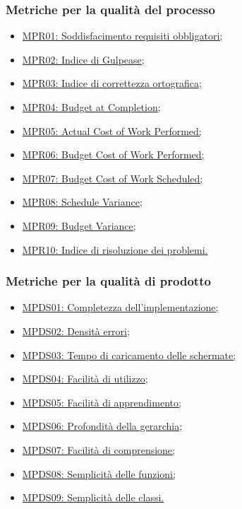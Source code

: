 \subsubsection{Metriche per la qualità del processo}
\begin{itemize}
	\item  \hyperlink{MSoddRequisiti}{MPR01: Soddisfacimento requisiti obbligatori;}
	\item \hyperlink{MGulpease}{MPR02: Indice di Gulpease;}
	\item  \hyperlink{MOrtografia}{MPR03: Indice di correttezza ortografica;}
	\item  \hyperlink{MBC}{MPR04: Budget at Completion;}
	\item  \hyperlink{MACWP}{MPR05: Actual Cost of Work Performed;}
	\item  \hyperlink{MBCWP}{MPR06: Budget Cost of Work Performed;}
	\item  \hyperlink{MBCWS}{MPR07: Budget Cost of Work Scheduled;}
	\item  \hyperlink{MSV}{MPR08: Schedule Variance;}
	\item  \hyperlink{MBV}{MPR09: Budget Variance;}
	\item  \hyperlink{MProblemi}{MPR10: Indice di risoluzione dei problemi.} 
\end{itemize}

\subsubsection{Metriche per la qualità di prodotto}
\begin{itemize}
\item\hyperlink{MCImplementazione}{MPDS01: Completezza dell'implementazione;}
\item \hyperlink{MErrori}{MPDS02: Densità errori;}
\item\hyperlink{MCViste}{MPDS03: Tempo di caricamento delle schermate;}
\item\hyperlink{MFUtilizzo}{MPDS04: Facilità di utilizzo;}
\item\hyperlink{MFApprendimento}{MPDS05: Facilità di apprendimento;}
\item \hyperlink{MPGerarchia}{MPDS06: Profondità della gerarchia;}
\item \hyperlink{MSFComprensione}{MPDS07: Facilità di comprensione;}
\item \hyperlink{MSFunzioni}{MPDS08: Semplicità delle funzioni;}
\item \hyperlink{MSC}{MPDS09: Semplicità delle classi.}
\end{itemize}
